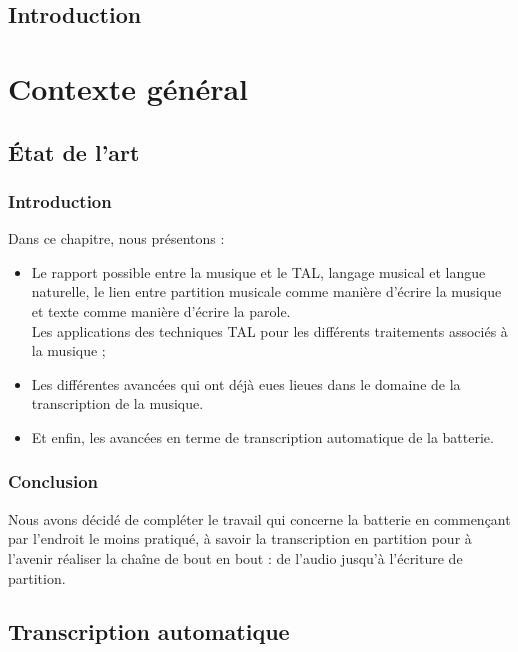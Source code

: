 \documentclass[a4paper,11pt,twoside]{memoir}
\newcommand{\nocontentsline}[3]{}
\newcommand{\tocless}[2]{\bgroup\let\addcontentsline=\nocontentsline#1{#2}\egroup}
\begin{document}
\sloppy
\dominitoc

\newpage
\setcounter{tocdepth}{1}
\tocless\tableofcontents
\newpage
\listoffigures
\listoftables
\printnomenclature
\newpage

\chapter*{Introduction}
\adjustmtc
{} 


\part{Contexte général}
\chapter{\'Etat de l'art}
\label{chap:articles}
\adjustmtc
\minitoc

\section{Introduction}
Dans ce chapitre, nous présentons :
\begin{itemize}
	\item Le rapport possible entre la musique et le TAL, langage musical et langue naturelle, le lien entre partition musicale comme manière d’écrire la musique et texte comme manière d’écrire la parole.\\Les applications des techniques TAL pour les différents traitements associés à la musique ;
	\item Les différentes avancées qui ont déjà eues lieues dans le domaine de la transcription de la musique.
	\item Et enfin, les avancées en terme de transcription automatique de la batterie.
\end{itemize}



\section{Conclusion}
Nous avons décidé de compléter le travail qui concerne la batterie en commençant par l’endroit le moins pratiqué, à savoir la transcription en partition pour à l’avenir réaliser la chaîne de bout en bout : de l’audio jusqu’à l’écriture de partition.


\chapter{Transcription automatique}
\label{chap:transcription automatique}
\minitoc
\end{document}
